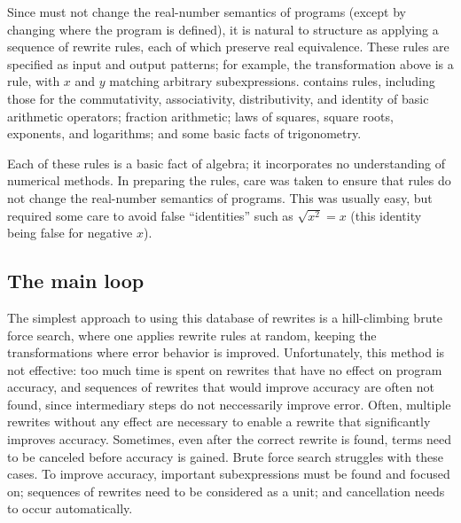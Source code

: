 \documentclass[paper.tex]{subfiles}
\begin{document}
Since \casio must not change the real-number semantics of programs
  (except by changing where the program is defined),
  it is natural to structure \casio
  as applying a sequence of rewrite rules,
  each of which preserve real equivalence.
These rules are specified as input and output patterns;
  for example, the transformation above is a rule,
  with $x$ and $y$ matching arbitrary subexpressions.
\casio contains \nRewrites rules,
  including those for
  the commutativity, associativity, distributivity, and identity
  of basic arithmetic operators;
  fraction arithmetic;
  laws of squares, square roots, exponents, and logarithms;
  and some basic facts of trigonometry.

Each of these rules is a basic fact of algebra;
  it incorporates no understanding of numerical methods.
In preparing the rules,
  care was taken to ensure that rules
  do not change the real-number semantics of programs.
This was usually easy, but required some care
  to avoid false ``identities'' such as $\sqrt{x^2} = x$
  (this identity being false for negative $x$).

\subsection{The main loop}

The simplest approach to using this database of rewrites
  is a hill-climbing brute force search,
  where one applies rewrite rules at random,
  keeping the transformations where error behavior is improved.
Unfortunately, this method is not effective:
  too much time is spent on rewrites
  that have no effect on program accuracy,
  and sequences of rewrites that would improve accuracy
  are often not found, since intermediary steps do not neccessarily improve error.
Often, multiple rewrites without any effect
  are necessary to enable a rewrite that significantly improves accuracy.
Sometimes, even after the correct rewrite is found,
  terms need to be canceled before accuracy is gained.
Brute force search struggles with these cases.
To improve accuracy, important subexpressions
  must be found and focused on;
  sequences of rewrites need to be considered as a unit;
  and cancellation needs to occur automatically.
\end{document}

